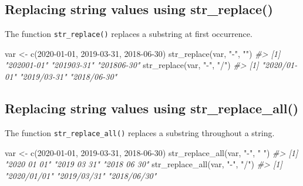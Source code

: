 \documentclass[
]{book}
\newenvironment{Shaded}{\begin{snugshade}}{\end{snugshade}}
\newcommand{\CommentTok}[1]{\textcolor[rgb]{0.56,0.35,0.01}{\textit{#1}}}
\newcommand{\FunctionTok}[1]{\textcolor[rgb]{0.00,0.00,0.00}{#1}}
\newcommand{\NormalTok}[1]{#1}
\newcommand{\OtherTok}[1]{\textcolor[rgb]{0.56,0.35,0.01}{#1}}
\newcommand{\StringTok}[1]{\textcolor[rgb]{0.31,0.60,0.02}{#1}}
\begin{document}
\hypertarget{replacing-string-values-using-str_replace}{%
\subsection{Replacing string values using str\_replace()}\label{replacing-string-values-using-str_replace}}

The function \texttt{str\_replace()} replaces a substring at first occurrence.

\begin{Shaded}
\begin{Highlighting}[]
\NormalTok{var }\OtherTok{\textless{}{-}} \FunctionTok{c}\NormalTok{(}\StringTok{\textquotesingle{}2020{-}01{-}01\textquotesingle{}}\NormalTok{, }\StringTok{\textquotesingle{}2019{-}03{-}31\textquotesingle{}}\NormalTok{, }\StringTok{\textquotesingle{}2018{-}06{-}30\textquotesingle{}}\NormalTok{)}
\FunctionTok{str\_replace}\NormalTok{(var, }\StringTok{"{-}"}\NormalTok{, }\StringTok{""}\NormalTok{)}
\CommentTok{\#\textgreater{} [1] "202001{-}01" "201903{-}31" "201806{-}30"}
\FunctionTok{str\_replace}\NormalTok{(var, }\StringTok{"{-}"}\NormalTok{, }\StringTok{"/"}\NormalTok{)}
\CommentTok{\#\textgreater{} [1] "2020/01{-}01" "2019/03{-}31" "2018/06{-}30"}
\end{Highlighting}
\end{Shaded}

\hypertarget{replacing-string-values-using-str_replace_all}{%
\subsection{Replacing string values using str\_replace\_all()}\label{replacing-string-values-using-str_replace_all}}

The function \texttt{str\_replace\_all()} replaces a substring throughout a string.

\begin{Shaded}
\begin{Highlighting}[]
\NormalTok{var }\OtherTok{\textless{}{-}} \FunctionTok{c}\NormalTok{(}\StringTok{\textquotesingle{}2020{-}01{-}01\textquotesingle{}}\NormalTok{, }\StringTok{\textquotesingle{}2019{-}03{-}31\textquotesingle{}}\NormalTok{, }\StringTok{\textquotesingle{}2018{-}06{-}30\textquotesingle{}}\NormalTok{)}
\FunctionTok{str\_replace\_all}\NormalTok{(var, }\StringTok{"{-}"}\NormalTok{, }\StringTok{" "}\NormalTok{)}
\CommentTok{\#\textgreater{} [1] "2020 01 01" "2019 03 31" "2018 06 30"}
\FunctionTok{str\_replace\_all}\NormalTok{(var, }\StringTok{"{-}"}\NormalTok{, }\StringTok{"/"}\NormalTok{)}
\CommentTok{\#\textgreater{} [1] "2020/01/01" "2019/03/31" "2018/06/30"}
\end{Highlighting}
\end{Shaded}
\end{document}

